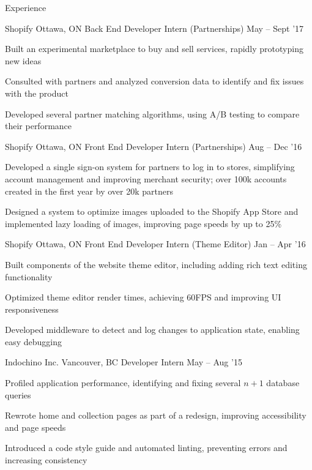 \documentclass{resume} %
\begin{document}
\begin{rSection}{Experience}
  \begin{rSubsection}{Shopify}
                     {Ottawa, ON}
                     {Back End Developer Intern (Partnerships)}
                     {May -- Sept '17}
    \item Built an experimental marketplace to buy and sell services, rapidly prototyping new ideas
    \item Consulted with partners and analyzed conversion data to identify and fix issues with the product
    \item Developed several partner matching algorithms, using A/B testing to compare their performance
  \end{rSubsection}

  \begin{rSubsection}{Shopify}
                     {Ottawa, ON}
                     {Front End Developer Intern (Partnerships)}
                     {Aug -- Dec '16}
    \item Developed a single sign-on system for partners to log in to stores, simplifying account management and improving merchant security; over 100k accounts created in the first year by over 20k partners
    \item Designed a system to optimize images uploaded to the Shopify App Store and implemented lazy loading of images, improving page speeds by up to 25\%
  \end{rSubsection}

  \begin{rSubsection}{Shopify}
                     {Ottawa, ON}
                     {Front End Developer Intern (Theme Editor)}
                     {Jan -- Apr '16}
    \item Built components of the website theme editor, including adding rich text editing functionality
    \item Optimized theme editor render times, achieving 60FPS and improving UI responsiveness
    \item Developed middleware to detect and log changes to application state, enabling easy debugging
  \end{rSubsection}

  \begin{rSubsection}{Indochino Inc.}
                     {Vancouver, BC}
                     {Developer Intern}
                     {May -- Aug '15}
    \item Profiled application performance, identifying and fixing several $n+1$ database queries
    \item Rewrote home and collection pages as part of a redesign, improving accessibility and page speeds
    \item Introduced a code style guide and automated linting, preventing errors and increasing consistency
  \end{rSubsection}


\end{rSection}
\end{document}
